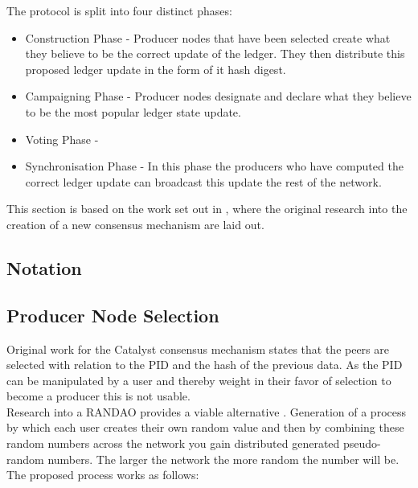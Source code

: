 \documentclass{article}
\begin{document}
The protocol is split into four distinct phases:

\begin{itemize}

\item Construction Phase - Producer nodes that have been selected create what they believe to be the correct update of the ledger. They then distribute this proposed ledger update in the form of it hash digest.
\item Campaigning Phase - Producer nodes designate and declare what they believe to be the most popular ledger state update. 
\item Voting Phase - 	
\item Synchronisation Phase - In this phase the producers who have computed the correct ledger update can broadcast this update the rest of the network. 

\end{itemize} 

This section is based on the work set out in \cite{catalystresearch}, where the original research into the creation of a new consensus mechanism are laid out. 

\subsection{Notation} 

\subsection{Producer Node Selection} 



Original work for the Catalyst consensus mechanism states that the peers are selected with relation to the PID and the hash of the previous data. As the PID can be manipulated by a user and thereby weight in their favor of selection to become a producer this is not usable. \\

Research into a RANDAO provides a viable alternative \cite{skvorc}\cite{randao}. Generation of a process by which each user creates their own random value and then by combining these random numbers across the network you gain distributed generated pseudo-random numbers. The larger the network the more random the number will be. The proposed process works as follows: \\
\end{document}
